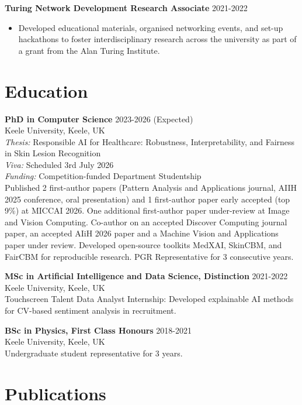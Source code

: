 \documentclass[10pt,a4paper]{article}
\begin{document}
\textbf{Turing Network Development Research Associate} \hfill 2021-2022
\begin{itemize}
\item Developed educational materials, organised networking events, and set-up hackathons to foster interdisciplinary research across the university as part of a grant from the Alan Turing Institute.
\end{itemize}

\section{Education}

\textbf{PhD in Computer Science} \hfill 2023-2026 (Expected)\\
Keele University, Keele, UK\\
\textit{Thesis:} Responsible AI for Healthcare: Robustness, Interpretability, and Fairness in Skin Lesion Recognition\\[2pt]
\textit{Viva:} Scheduled 3rd July 2026\\[2pt]
\textit{Funding:} Competition-funded Department Studentship\\[2pt]
Published 2 first-author papers (Pattern Analysis and Applications journal, AIIH 2025 conference, oral presentation) and 1 first-author paper early accepted (top 9\%) at MICCAI 2026. One additional first-author paper under-review at Image and Vision Computing. Co-author on an accepted Discover Computing journal paper, an accepted AIiH 2026 paper and a Machine Vision and Applications paper under review. Developed open-source toolkits MedXAI, SkinCBM, and FairCBM for reproducible research. PGR Representative for 3 consecutive years.

\textbf{MSc in Artificial Intelligence and Data Science, Distinction} \hfill 2021-2022\\
Keele University, Keele, UK\\[2pt]
Touchscreen Talent Data Analyst Internship: Developed explainable AI methods for CV-based sentiment analysis in recruitment.

\textbf{BSc in Physics, First Class Honours} \hfill 2018-2021\\
Keele University, Keele, UK\\
Undergraduate student representative for 3 years.\\

\section{Publications}
\end{document}
